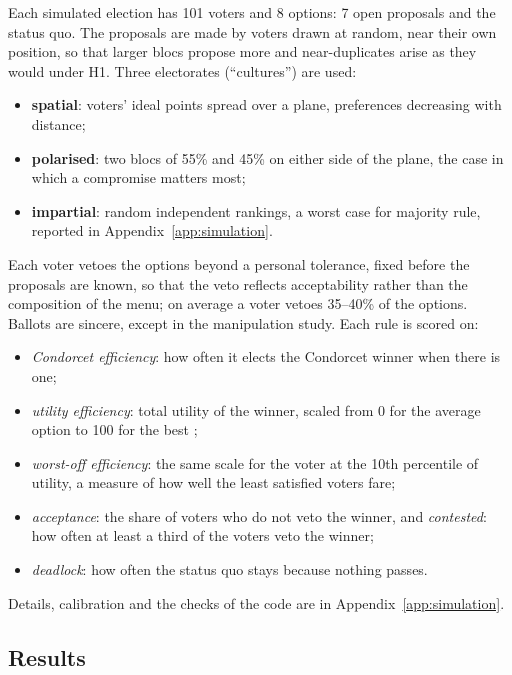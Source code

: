 Each simulated election has 101 voters and 8 options: 7 open proposals and the status quo. The
proposals are made by voters drawn at random, near their own position, so that larger blocs propose more
and near-duplicates arise as they would under H1. Three electorates (``cultures'') are used:
\begin{itemize}
  \item \textbf{spatial}: voters' ideal points spread over a plane, preferences decreasing with distance;
  \item \textbf{polarised}: two blocs of 55\% and 45\% on either side of the plane, the case in which a
  compromise matters most;
  \item \textbf{impartial}: random independent rankings, a worst case for majority rule, reported in
  Appendix~\ref{app:simulation}.
\end{itemize}
Each voter vetoes the options beyond a personal tolerance, fixed before the proposals are known, so that
the veto reflects acceptability rather than the composition of the menu; on average a voter vetoes 35--40\% of
the options. Ballots are sincere, except in the manipulation study. Each rule is scored on:
\begin{itemize}
  \item \emph{Condorcet efficiency}: how often it elects the Condorcet winner when there is one;
  \item \emph{utility efficiency}: total utility of the winner, scaled from 0 for the average option to
  100 for the best \citep{Merrill1984};
  \item \emph{worst-off efficiency}: the same scale for the voter at the 10th percentile of utility, a
  measure of how well the least satisfied voters fare;
  \item \emph{acceptance}: the share of voters who do not veto the winner, and \emph{contested}: how often
  at least a third of the voters veto the winner;
  \item \emph{deadlock}: how often the status quo stays because nothing passes.
\end{itemize}
Details, calibration and the checks of the code are in Appendix~\ref{app:simulation}.

\subsection{Results}



